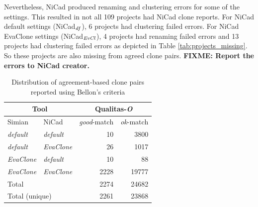 \documentclass{sig-alternate-05-2015}
\newcommand\FIXME[1]{\textbf{FIXME: #1}}
\begin{document}
Nevertheless,  NiCad produced renaming and clustering errors for some of the settings. This resulted in not all 109 projects had NiCad clone reports. For NiCad default settings (NiCad$_{\textrm{\textit{df}}}$), 6 projects had clustering failed errors. For NiCad EvaClone settings (NiCad$_{\textrm{\textit{EvCl}}}$), 4 projects had renaming failed errors and 13 projects had clustering failed errors as depicted in Table \ref{tab:projects_missing}. So these projects are also missing from agreed clone pairs. \FIXME{Report the errors to NiCad creator.}


\begin{table}[H]
	\centering
	\caption{Distribution of agreement-based clone pairs reported using Bellon's criteria}
	\label{t_agreed_good_clone_pairs}
	\small
	\begin{tabular}{l|l|r|r}
		\hline
		\multicolumn{2}{c|}{Tool} & \multicolumn{2}{c}{Qualitas-\textit{O}} \\
		\hline
		Simian & NiCad & \textit{good}-match & \textit{ok}-match \\
		\hline
		\textit{default} & \textit{default} & 10 	& 3800 \\ 
		\textit{default} & \textit{EvaClone} 	& 26 	& 1017 \\ 
		\textit{EvaClone} 	& \textit{default} 	& 10 	& 88 \\
		\textit{EvaClone} 	& \textit{EvaClone} 	& 2228 & 19777 \\ 
		\hline
		\multicolumn{2}{l|}{Total} & 2274 & 24682 \\
		\hline
		\multicolumn{2}{l|}{Total (unique)} & 2261 & 23868 \\
		\hline
	\end{tabular}
\end{table}
\end{document}

